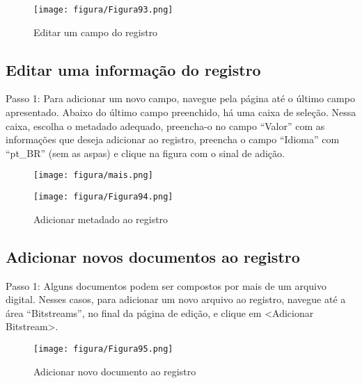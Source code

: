 \documentclass[12pt,hidelinks]{article}
\begin{document}
    \begin{figure}[!htp]
                \centering
                \texttt{[image: figura/Figura93.png]}
                \caption{Editar um campo do registro}
            \label{Rotulo}
        \end{figure}
    
    \subsection{Editar uma informação do registro}
    
    
    Passo 1: Para adicionar um novo campo, navegue pela página até o último campo apresentado.
    Abaixo do último campo preenchido, há uma caixa de seleção. Nessa caixa, escolha o metadado
    adequado, preencha-o no campo “Valor” com as informações que deseja adicionar ao registro,
    preencha o campo “Idioma” com “pt\_BR” (sem as aspas) e clique na figura com o sinal de adição.
    
    \begin{figure}[!htp]
                \centering
                \texttt{[image: figura/mais.png]}
            \label{Rotulo}
        \end{figure}

\newpage

    \begin{figure}[!htp]
                \centering
                \texttt{[image: figura/Figura94.png]}
                \caption{Adicionar metadado ao registro}
            \label{Rotulo}
        \end{figure}
    
    \subsection{Adicionar novos documentos ao registro}
    
    Passo 1: Alguns documentos podem ser compostos por mais de um arquivo digital. Nesses casos, para adicionar um novo arquivo ao registro, navegue até a área “Bitstreams”, no final da página de edição, e clique em <Adicionar Bitstream>.
    
    \begin{figure}[!htp]
                \centering
                \texttt{[image: figura/Figura95.png]}
                \caption{Adicionar novo documento ao registro}
            \label{Rotulo}
        \end{figure}
\end{document}
